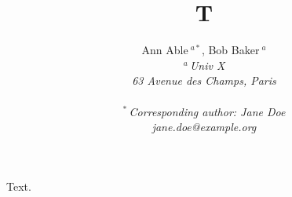 \documentclass[conference]{IEEEtran}
\title{T}
\author{{Ann Able{\small $~^{a*}$}, Bob Baker{\small $~^{a}$} }
{}\vspace{1.6mm}\\ \itshape
$^{a}$\,Univ X\\ 63 Avenue des Champs, Paris\\ \,\\
$^{*}$\,Corresponding author: Jane Doe\\ jane.doe@example.org\\}
\begin{document}
\maketitle
Text.
\end{document}
